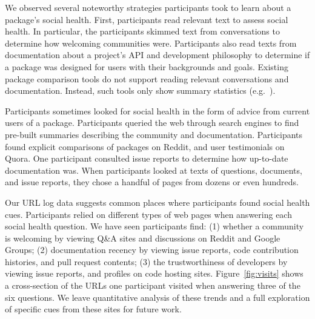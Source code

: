 We observed several noteworthy strategies participants took to learn about a package's social health.
First, participants read relevant text to assess social health.
In particular, the participants skimmed text from conversations to determine how welcoming communities were.
Participants also read texts from documentation about a project's API and development philosophy to determine if a package was designed for users with their backgrounds and goals.
Existing package comparison tools do not support reading relevant conversations and documentation.
Instead, such tools only show summary statistics (e.g.~\cite{awesome_python,ruby_toolbox}).

Participants sometimes looked for social health in the form of advice from current users of a package.
Participants queried the web through search engines to find pre-built summaries describing the community and documentation.
Participants found explicit comparisons of packages on Reddit, and user testimonials on Quora.
One participant consulted issue reports to determine how up-to-date documentation was.
When participants looked at texts of questions, documents, and issue reports, they chose a handful of pages from dozens or even hundreds.

Our URL log data suggests common places where participants found social health cues.
Participants relied on different types of web pages when answering each social health question.
We have seen participants find:
(1) whether a community is welcoming by viewing Q\&A sites and discussions on Reddit and Google Groups;
(2) documentation recency by viewing issue reports, code contribution histories, and pull request contents;
(3) the trustworthiness of developers by viewing issue reports, and profiles on code hosting sites.
Figure~\ref{fig:visits} shows a cross-section of the URLs one participant visited when answering three of the six questions.
We leave quantitative analysis of these trends and a full exploration of specific cues from these sites for future work.

